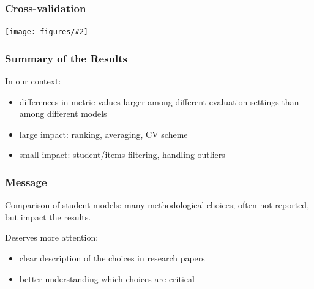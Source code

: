 \documentclass[bigger]{beamer}
\newcommand{\img}[2]{
  \begin{center}
    \texttt{[image: figures/\#2]}
  \end{center}
}
\begin{document}
\begin{frame}
  \frametitle{Cross-validation}
  \img{1.0}{cv--turtle}

\end{frame}

\begin{frame}
  \frametitle{Summary of the Results}

  In our context:
  \begin{itemize}
  \item differences in metric values larger among different evaluation settings
        than among different models
  \item large impact: ranking, averaging, CV scheme
  \item small impact: student/items filtering, handling outliers
  \end{itemize}

\end{frame}


\begin{frame}
  \frametitle{Message}

  Comparison of student models: many methodological choices; often not
  reported, but impact the results.

  \bigskip
  Deserves more attention:
  \begin{itemize}
  \item clear description of the choices in research papers
  \item better understanding which choices are critical
  \end{itemize}

\end{frame}

\end{document}
